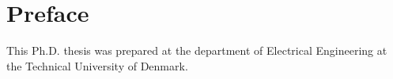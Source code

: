 \chapter{Preface}
This Ph.D. thesis was prepared at the department of Electrical Engineering at the Technical University of Denmark.

\vfill

{
\centering
\begin{flushright}
    \thesisauthor{}
\end{flushright}
}